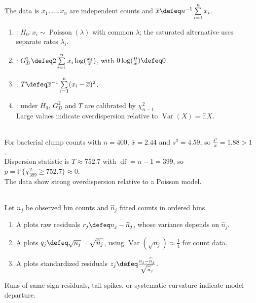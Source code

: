 \begin{definition} \label{def:poisson-dispersion-test} \\
The data is $x_1,\ldots,x_n$ are independent counts and $\overline{x}\defeq n^{-1}\sum\limits_{i=1}^nx_i$.
\begin{enumerate}[label=(\roman*)]
\setlength{\itemsep}{0pt}
\item {}: $H_0:x_i\sim\operatorname{Poisson}(\lambda)$ with common $\lambda$; the saturated alternative uses separate rates $\lambda_i$.
\item {}: $G_D^2\defeq2\sum\limits_{i=1}^nx_i\log(\frac{x_i}{\overline{x}})$, with $0\log(\frac{0}{\overline{x}})\defeq0$.
\item {}: $T\defeq\overline{x}^{-1}\sum\limits_{i=1}^n(x_i-\overline{x})^2$.
\item {}: under $H_0$, $G_D^2$ and $T$ are calibrated by $\chi^2_{n-1}$\\
Large values indicate overdispersion relative to $\operatorname{Var}(X)=\mathbb{E}X$.
\end{enumerate}
\end{definition}

\begin{example} \label{ex:bacterial-clumps-dispersion} \\
For bacterial clump counts with $n=400$, $\overline{x}=2.44$ and $s^2=4.59$, so $\frac{s^2}{\overline{x}}=1.88>1$.\\
Dispersion statistic is $T\approx752.7$ with $\operatorname{df}=n-1=399$, so $p=\mathbb{P}\{\chi^2_{399}\geq752.7\}\approx0$.\\
The data show strong overdispersion relative to a Poisson model.
\end{example}

\begin{definition} \label{def:hanging-rootogram-and-chigram} \\
Let $n_j$ be observed bin counts and $\widehat n_j$ fitted counts in ordered bins.
\begin{enumerate}[label=(\roman*)]
\setlength{\itemsep}{0pt}
\item A  plots raw residuals $r_j\defeq n_j-\widehat n_j$, whose variance depends on $\widehat n_j$.
\item A  plots $q_j\defeq\sqrt{n_j}-\sqrt{\widehat n_j}$, using $\operatorname{Var}(\sqrt{n_j})\approx\frac{1}{4}$ for count data.
\item A  plots standardized residuals $z_j\defeq\frac{n_j-\widehat n_j}{\sqrt{\widehat n_j}}$.
\end{enumerate}
Runs of same-sign residuals, tail spikes, or systematic curvature indicate model departure.
\end{definition}

